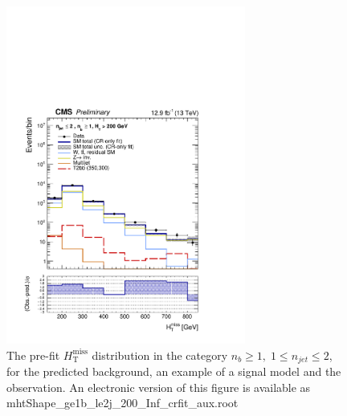 \clearpage
\begin{figure}[tbhp]
    \caption{ 
    The pre-fit $H_{\mathrm{T}}^{\mathrm{miss}}$ distribution in the category $n_{b}\geq 1, \; 1 \leq n_{jet} \leq 2$, 
    for the predicted background, an example of a signal model and the observation.
    An electronic version of this figure is available as mhtShape\_ge1b\_le2j\_200\_Inf\_crfit\_aux.root
    \label{fig:mhtShape_ge1b_le2j_crfit} }
  \begin{center}
  \includegraphics[width=0.7\textwidth]{mhtShape_ge1b_le2j_200_Inf_crfit_aux}
  \end{center}
\end{figure}


